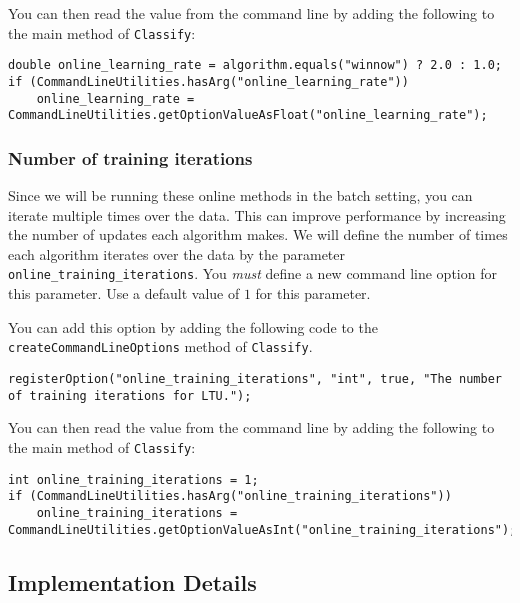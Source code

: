 \documentclass[11pt]{article}
\newcommand{\code}[1]{{\footnotesize \tt #1}}
\begin{document}
You can then read the value from the command line by adding the following to the main method of \code{Classify}:
\begin{footnotesize}
\begin{verbatim}
double online_learning_rate = algorithm.equals("winnow") ? 2.0 : 1.0;
if (CommandLineUtilities.hasArg("online_learning_rate"))
    online_learning_rate = CommandLineUtilities.getOptionValueAsFloat("online_learning_rate");
\end{verbatim}
\end{footnotesize}

\subsubsection{Number of training iterations}
Since we will be running these online methods in the batch setting, you can iterate multiple times over the data. This can improve performance by increasing the number of updates each algorithm makes. We will define the number of times each algorithm iterates over the data by the parameter \code{online\_training\_iterations}. You \emph{must} define a new command line option for this parameter. Use a default value of $1$ for this parameter.

You can add this option by adding the following code to the \code{createCommandLineOptions} method of \code{Classify}.
\begin{footnotesize}
\begin{verbatim}
registerOption("online_training_iterations", "int", true, "The number of training iterations for LTU.");
\end{verbatim}
\end{footnotesize}


You can then read the value from the command line by adding the following to the main method of \code{Classify}:
\begin{footnotesize}
\begin{verbatim}
int online_training_iterations = 1;
if (CommandLineUtilities.hasArg("online_training_iterations"))
    online_training_iterations = CommandLineUtilities.getOptionValueAsInt("online_training_iterations");
\end{verbatim}
\end{footnotesize}




\subsection{Implementation Details}
\end{document}
